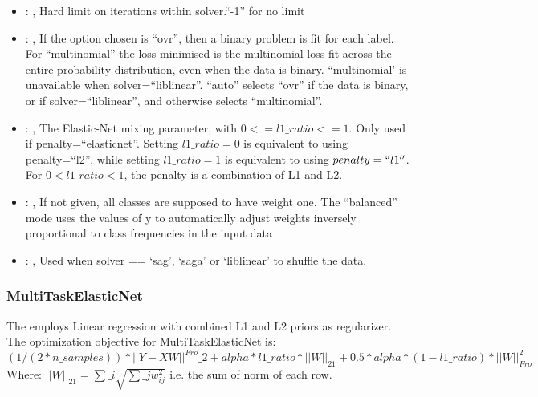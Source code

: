 \begin{itemize}
    \item {}: , 
      Hard limit on iterations within solver.``-1'' for no limit

    \item {}: , 
      If the option chosen is ``ovr'', then a binary problem is fit for each label. For
      ``multinomial''                                                  the loss minimised is the
      multinomial loss fit across the entire probability distribution, even when the
      data is binary. ``multinomial' is unavailable when solver=``liblinear''. ``auto'' selects
      ``ovr'' if the data is                                                  binary, or if
      solver=``liblinear'', and otherwise selects ``multinomial''.

    \item {}: , 
      The Elastic-Net mixing parameter, with $0 <= l1\_ratio <= 1$. Only used if
      penalty=``elasticnet''.                                                  Setting $l1\_ratio=0$
      is equivalent to using penalty=``l2'', while setting $l1\_ratio=1$ is equivalent to using
      $penalty=``l1''$. For $0 < l1\_ratio <1$, the penalty is a combination of L1 and L2.

    \item {}: \xmlDesc{[balanced]}, 
      If not given, all classes are supposed to have weight one.
      The “balanced” mode uses the values of y to automatically adjust weights
      inversely proportional to class frequencies in the input data

    \item {}: , 
      Used when solver == ‘sag’, ‘saga’ or ‘liblinear’ to shuffle the data.
  \end{itemize}


\subsubsection{MultiTaskElasticNet}
  The  employs                         Linear regression with combined
  L1 and L2 priors as regularizer.                         The optimization objective for
  MultiTaskElasticNet is:                         $(1 / (2 * n\_samples)) * ||Y - XW||^{Fro}\_2
  + alpha * l1\_ratio * ||W||_{21}                         + 0.5 * alpha * (1 - l1\_ratio) *
  ||W||_{Fro}^2$                         \\Where:                         $||W||_{21} = \sum\_i
  \sqrt{\sum\_j w_{ij}^2}$                         i.e. the sum of norm of each row.

